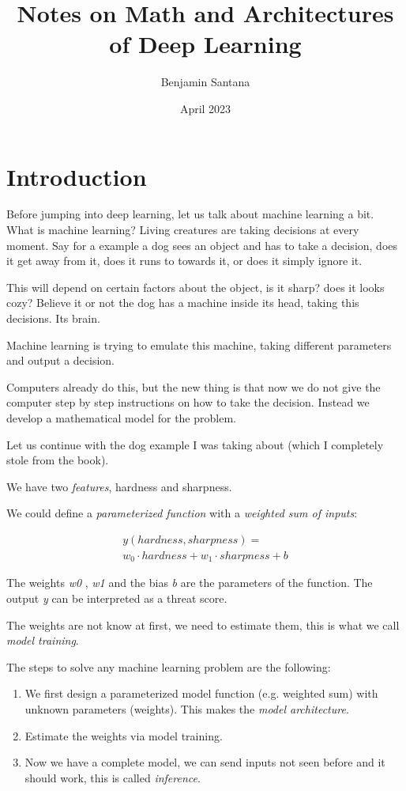 \documentclass[twocolumn]{article}
\title{Notes on Math and Architectures of Deep Learning}
\author{Benjamin Santana}
\date{April 2023}
\begin{document}
   \maketitle

\section{Introduction}

Before jumping into deep learning, let us talk about machine learning a bit.
What is machine learning? Living creatures are taking decisions at every moment.
Say for a example a dog sees an object and has to take a decision, does it get
away from it, does it runs to towards it, or does it simply ignore it.

This will depend on certain factors about the object, is it sharp? does it
looks cozy? Believe it or not the dog has a machine inside its head, taking
this decisions. Its brain.

Machine learning is trying to emulate this machine, taking different parameters
and output a decision.

Computers already do this, but the new thing is that now we do not give the
computer step by step instructions on how to take the decision. Instead we
develop a mathematical model for the problem.

Let us continue with the dog example I was taking about (which I completely
stole from the book).

We have two \emph{features}, hardness and sharpness.

We could define a \emph{parameterized function} with a \emph{weighted sum of
inputs}:

\noindent
\begin{multline}
    y(hardness, sharpness) = \\ w_0 \cdot hardness + w_1 \cdot sharpness + b
\end{multline}

The weights \emph{w0} , \emph{w1} and the bias \emph{b} are the parameters of
the function. The output \emph{y} can be interpreted as a threat score.

The weights are not know at first, we need to estimate them, this is what we
call \emph{model training}.

The steps to solve any machine learning problem are the following:
\begin{enumerate}
    \item We first design a parameterized model function (e.g. weighted sum)
        with unknown parameters (weights). This makes the \emph{model
        architecture}.
    \item Estimate the weights via model training.
    \item Now we have a complete model, we can send inputs not seen before and
        it should work, this is called \emph{inference}.
\end{enumerate}
\end{document}
